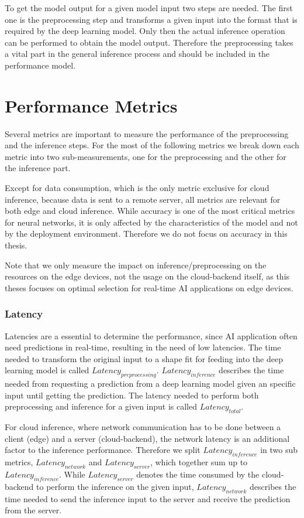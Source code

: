 To get the model output for a given model input two steps are needed. The first one is the preprocessing step and transforms a given input into the format that is required by the deep learning model. Only then the actual inference operation can be performed to obtain the model output. Therefore the preprocessing takes a vital part in the general inference process and should be included in the performance model.


\section{Performance Metrics}
\label{chap:metrics}
Several metrics are important to measure the performance of the preprocessing and the inference steps. For the most of the following metrics we break down each metric into two sub-measurements, one for the preprocessing  and the other for the inference part.

Except for data consumption, which is the only metric exclusive for cloud inference, because data is sent to a remote server, all metrics are relevant for both edge and cloud inference.
While accuracy is one of the most critical metrics for neural networks, it is only affected by the characteristics of the model and not by the deployment environment. Therefore we do not focus on accuracy in this thesis.

Note that we only measure the impact on inference/preprocessing on the resources on the edge devices, not the usage on the cloud-backend itself, as this theses focuses on optimal selection for real-time AI applications on edge devices.
\subsubsection{Latency}
Latencies are a essential to determine the performance, since AI application often need predictions in real-time, resulting in the need of low latencies.
The time needed to transform the original input to a shape fit for feeding into the deep learning model is called $Latency_{preprocessing}$.
$Latency_{inference}$ describes the time needed from requesting a prediction from a deep learning model given an specific input until getting the prediction.
The latency needed to perform both preprocessing and inference for a given input is called $Latency_{total}$.

For cloud inference, where network communication has to be done between a client (edge) and a server (cloud-backend), the network latency is an additional factor to the inference performance.
Therefore we split $Latency_{inference}$ in two sub metrics, $Latency_{network}$ and $Latency_{server}$, which together sum up to $Latency_{inference}$.
While $Latency_{server}$ denotes the time consumed by the cloud-backend to perform the inference on the given input, $Latency_{network}$ describes the time needed to send the inference input to the server and receive the prediction from the server.
